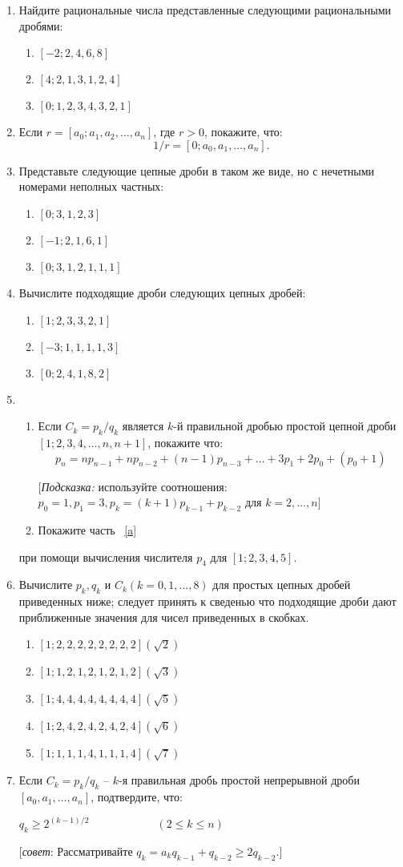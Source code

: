 \documentclass[11pt]{article}
\begin{document}
\begin{enumerate}
		\item Найдите рациональные числа представленные следующими рациональными дробями:
			\begin{enumerate}
			\item$[-2;2,4,6,8]$ \item$[4;2,1,3,1,2,4]$ \item$[0;1,2,3,4,3,2,1]$
	\end{enumerate}	
				\item Если $r=[a_0;a_1,a_2,\dots,a_n]$, где $r>0$, покажите, что:
				 $$1/r=[0;a_0,a_1,\dots,a_n].$$
				 \item Представьте следующие цепные дроби в таком же виде, но с нечетными номерами неполных частных:
			\begin{enumerate}
				\item$[0;3,1,2,3]$ \item$[-1;2,1,6,1]$ \item$[0;3,1,2,1,1,1]$
	\end{enumerate}	 
		\item Вычислите подходящие дроби следующих цепных дробей:
\begin{enumerate}
			\item$[1;2,3,3,2,1]$ \item$[-3;1,1,1,1,3]$ \item$[0;2,4,1,8,2]$
	\end{enumerate}	 
	\item \begin{enumerate} \item \label{a} Если $C_k=p_k/q_k$ является $k$-й правильной дробью простой цепной дроби $[1;2,3,4,\dots,n,n+1]$, покажите что:
	$$p_n=np_{n-1}+np_{n-2}+(n-1)p_{n-3}+\dots+3p_1+2p_0+(p_0+1)$$
	\begin{center}
		[\textit{Подсказка:} используйте соотношения: $p_0=1,p_1=3,p_k=(k+1)p_{k-1}+p_{k-2}$ для $k=2,\dots,n]$
		\end{center}
	\item Покажите часть ~\ref{a} 	\end{enumerate}	 при помощи вычисления числителя $p_4$ для $[1;2,3,4,5]$.
	\item Вычислите $p_k,q_k$ и $C_k(k=0,1,\dots,8)$ для простых цепных дробей приведенных ниже; следует принять к сведенью что подходящие дроби дают приближенные значения для чисел приведенных в скобках.
	\begin{enumerate}
	\item$[1;2,2,2,2,2,2,2,2](\sqrt{2})$
	\item$[1;1,2,1,2,1,2,1,2](\sqrt{3})$
	\item$[1;4,4,4,4,4,4,4,4](\sqrt{5})$
	\item$[1;2,4,2,4,2,4,2,4](\sqrt{6})$
	\item$[1;1,1,1,4,1,1,1,4](\sqrt{7})$
		\end{enumerate}	 
	\item Если $C_k=p_k/q_k$ -- $k$-я правильная дробь простой непрерывной дроби $[a_0,a_1,\dots,a_n]$, подтвердите, что: 
		\begin{center}
	$q_k\ge2^{(k-1)/2}\qquad\qquad\qquad(2\le k\le n)$
		\end{center}
	[\textit{совет}: Рассматривайте $q_k=a_kq_{k-1}+q_{k-2}\ge2q_{k-2}$.]
	

\end{enumerate}
\end{document}
